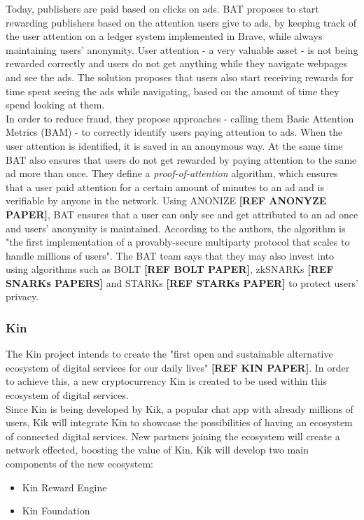 Today, publishers are paid based on clicks on ads. BAT proposes to start rewarding publishers based on the attention users give to ads, by keeping track of the user attention on a ledger system implemented in Brave, while always maintaining users' anonymity. User attention - a very valuable asset - is not being rewarded correctly and users do not get anything while they navigate webpages and see the ads. The solution proposes that users also start receiving rewards for time spent seeing the ads while navigating, based on the amount of time they spend looking at them. \\

In order to reduce fraud, they propose approaches - calling them Basic Attention Metrics (BAM) - to correctly identify users paying attention to ads. When the user attention is identified, it is saved in an anonymous way. At the same time BAT also ensures that users do not get rewarded by paying attention to the same ad more than once. They define a \textit{proof-of-attention} algorithm, which ensures that a user paid attention for a certain amount of minutes to an ad and is verifiable by anyone in the network. Using \textsf{ANONIZE} \textbf{[REF ANONYZE PAPER]}, BAT ensures that a user can only see and get attributed to an ad once and users' anonymity is maintained. According to the authors, the algorithm is "the first implementation of a provably-secure multiparty protocol that scales to handle millions of users".  The BAT team says that they may also invest into using algorithms such as BOLT \textbf{[REF BOLT PAPER]}, zkSNARKs \textbf{[REF SNARKs PAPERS]} and STARKs \textbf{[REF STARKs PAPER]} to protect users' privacy.

\subsubsection{Kin}

The Kin project intends to create the "first open and sustainable alternative ecosystem of digital services
for our daily lives" \textbf{[REF KIN PAPER]}. In order to achieve this, a new cryptocurrency Kin is created to be used within this ecosystem of digital services. \\

Since Kin is being developed by Kik, a popular chat app with already millions of users, Kik will integrate Kin to showcase the possibilities of having an ecosystem of connected digital services. New partners joining the ecosystem will create a network effected, boosting the value of Kin. Kik will develop two main components of the new ecosystem:
\begin{itemize}
	\item Kin Reward Engine
	\item Kin Foundation
\end{itemize}

